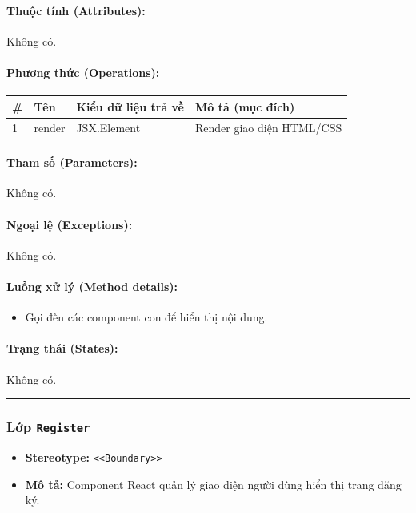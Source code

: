 \documentclass[12pt,a4paper]{article}
\begin{document}
\paragraph{Thuộc tính (Attributes):}
Không có.

\paragraph{Phương thức (Operations):}
\begin{longtable}{|p{0.6cm}|p{5.0cm}|p{2.8cm}|p{5.4cm}|}
\hline
\textbf{\#} & \textbf{Tên} & \textbf{Kiểu dữ liệu trả về} & \textbf{Mô tả (mục đích)} \\ \hline
\endhead
1 & render & JSX.Element & Render giao diện HTML/CSS \\ \hline
\end{longtable}

\paragraph{Tham số (Parameters):}
Không có.

\paragraph{Ngoại lệ (Exceptions):}
Không có.

\paragraph{Luồng xử lý (Method details):}
\begin{itemize}[leftmargin=*]
    \item Gọi đến các component con để hiển thị nội dung.
\end{itemize}


\paragraph{Trạng thái (States):}
Không có.

\vskip 0.5cm
\noindent\rule{\textwidth}{0.5pt}
\vskip 0.5cm

\subsubsection{Lớp \texttt{Register}}

\begin{itemize}[leftmargin=*]
    \item \textbf{Stereotype:} \texttt{\textless{}\textless{}Boundary\textgreater{}\textgreater{}}
    \item \textbf{Mô tả:} Component React quản lý giao diện người dùng hiển thị trang đăng ký.
\end{itemize}
\end{document}
